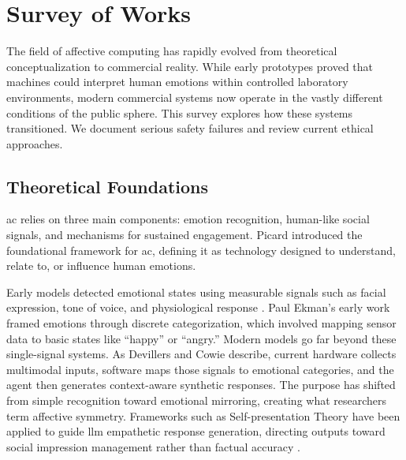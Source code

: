 \section{Survey of Works}
\label{sec:survey}

The field of affective computing has rapidly evolved from theoretical conceptualization to commercial reality. While early prototypes proved that machines could interpret human emotions within controlled laboratory environments, modern commercial systems now operate in the vastly different conditions of the public sphere. This survey explores how these systems transitioned. We document serious safety failures and review current ethical approaches.

\subsection{Theoretical Foundations}

\gls{ac} relies on three main components: emotion recognition, human-like social signals, and mechanisms for sustained engagement. Picard \cite[p.~1]{picard_affective_1995} introduced the foundational framework for \gls{ac}, defining it as technology designed to understand, relate to, or influence human emotions.

Early models detected emotional states using measurable signals such as facial expression, tone of voice, and physiological response \cite[p.~5]{picard_affective_1995}. Paul Ekman's \cite[p.~170]{ekman_argument_1992} early work framed emotions through discrete categorization, which involved mapping sensor data to basic states like ``happy'' or ``angry.'' Modern models go far beyond these single-signal systems. As Devillers and Cowie \cite[p.~1445]{devillers_ethical_2023} describe, current hardware collects multimodal inputs, software maps those signals to emotional categories, and the agent then generates context-aware synthetic responses. The purpose has shifted from simple recognition toward emotional mirroring, creating what researchers term affective symmetry. Frameworks such as Self-presentation Theory have been applied to guide \gls{llm} empathetic response generation, directing outputs toward social impression management rather than factual accuracy \cite{sun_rational_2024}.

